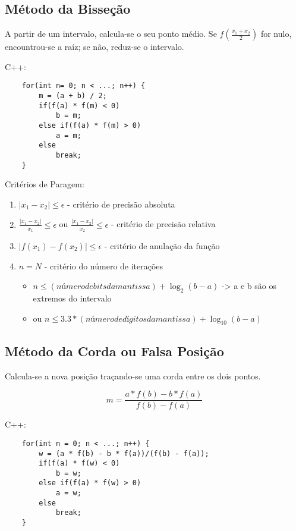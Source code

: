 \documentclass[../resumosMNUM.tex]{subfiles}
\begin{document}
 

\subsection{Método da Bisseção}

A partir de um intervalo, calcula-se o seu ponto médio. Se \(f(\frac{x_1+x_2}{2})\) for nulo, encountrou-se a raíz; se não, reduz-se o intervalo.

C++:
\begin{lstlisting}
    for(int n= 0; n < ...; n++) {
        m = (a + b) / 2;
        if(f(a) * f(m) < 0)
            b = m;
        else if(f(a) * f(m) > 0)
            a = m;
        else
            break;
    }
\end{lstlisting}

Critérios de Paragem:
\begin{enumerate}
    \item \(|x_1 - x_2| \leq \epsilon\) - critério de precisão absoluta
    \item \(\frac{|x_1 - x_2|}{x_1} \leq \epsilon\) ou \(\frac{|x_1 - x_2|}{x_2} \leq \epsilon\) - critério de precisão relativa
    \item \(|f(x_1) - f(x_2)| \leq \epsilon\) - critério de anulação da função
    \item \(n = N\) - critério do número de iterações
    \begin{itemize}
        \item \(n \leq (número de bits da mantissa) + \log_2(b - a)\) -> a e b são os extremos do intervalo 
        \item ou \(n \leq 3.3 * (número de dígitos da mantissa) + \log_{10}(b - a)\)
    \end{itemize}
\end{enumerate}

\subsection{Método da Corda ou Falsa Posição}

Calcula-se a nova posição traçando-se uma corda entre os dois pontos.

\[m = \frac{a * f(b) - b * f(a)}{f(b) - f(a)}\]

C++:
\begin{lstlisting}
    for(int n = 0; n < ...; n++) {
        w = (a * f(b) - b * f(a))/(f(b) - f(a));
        if(f(a) * f(w) < 0)
            b = w;
        else if(f(a) * f(w) > 0)
            a = w;
        else
            break;
    }
\end{lstlisting}
\end{document}
